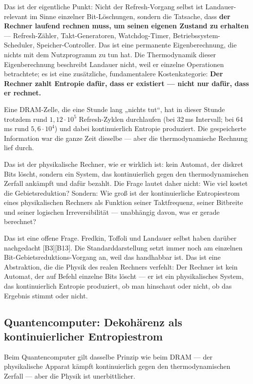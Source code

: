 Das ist der eigentliche Punkt: Nicht der Refresh-Vorgang selbst ist
Landauer-relevant im Sinne einzelner Bit-Löschungen, sondern die Tatsache, dass
\textbf{der Rechner laufend rechnen muss, um seinen eigenen Zustand zu erhalten}
--- Refresh-Zähler, Takt-Generatoren, Watchdog-Timer,
Betriebssystem-Scheduler, Speicher-Controller. Das ist eine permanente
Eigenberechnung, die nichts mit dem Nutzprogramm zu tun hat. Die Thermodynamik
dieser Eigenberechnung beschreibt Landauer nicht, weil er einzelne Operationen
betrachtete; es ist eine zusätzliche, fundamentalere Kostenkategorie:
\textbf{Der Rechner zahlt Entropie dafür, dass er existiert --- nicht nur dafür,
dass er rechnet.}

\LK Eine DRAM-Zelle, die eine Stunde lang „nichts tut“, hat in dieser Stunde
trotzdem rund $1{,}12\cdot10^{5}$ Refresh-Zyklen durchlaufen (bei 32\,ms
Intervall; bei 64\,ms rund $5{,}6\cdot10^{4}$) und dabei kontinuierlich Entropie
produziert. Die gespeicherte Information war die ganze Zeit dieselbe --- aber die
thermodynamische Rechnung lief durch.

Das ist der physikalische Rechner, wie er wirklich ist: kein Automat, der diskret
Bits löscht, sondern ein System, das kontinuierlich gegen den thermodynamischen
Zerfall ankämpft und dafür bezahlt. Die Frage lautet daher nicht: Wie viel kostet
die Gebietsreduktion? Sondern: Wie groß ist der kontinuierliche Entropiestrom
eines physikalischen Rechners als Funktion seiner Taktfrequenz, seiner Bitbreite
und seiner logischen Irreversibilität --- unabhängig davon, was er gerade
berechnet?

Das ist eine offene Frage. Fredkin, Toffoli und Landauer selbst haben darüber
nachgedacht [B3][B13]. Die Standarddarstellung setzt immer noch am einzelnen
Bit-Gebietsreduktions-Vorgang an, weil das handhabbar ist. Das ist eine
Abstraktion, die die Physik des realen Rechners verfehlt: Der Rechner ist kein
Automat, der auf Befehl einzelne Bits löscht --- er ist ein physikalisches System,
das kontinuierlich Entropie produziert, ob man hinschaut oder nicht, ob das
Ergebnis stimmt oder nicht.

\subsection{Quantencomputer: Dekohärenz als kontinuierlicher Entropiestrom}

Beim Quantencomputer gilt dasselbe Prinzip wie beim DRAM --- der physikalische
Apparat kämpft kontinuierlich gegen den thermodynamischen Zerfall --- aber die
Physik ist unerbittlicher.

